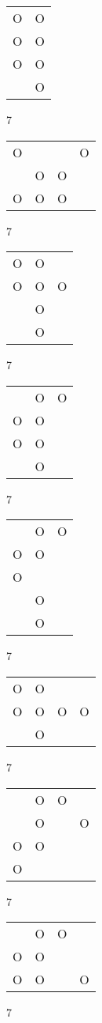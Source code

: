 \begin{tabular}{|m{0.2cm}m{0.2cm}|}\hline
O&O\\
O&O\\
O&O\\
 &O\\
\hline\end{tabular}7
\begin{tabular}{|m{0.2cm}m{0.2cm}m{0.2cm}m{0.2cm}|}\hline
O& & &O\\
 &O&O& \\
O&O&O& \\
\hline\end{tabular}7
\begin{tabular}{|m{0.2cm}m{0.2cm}m{0.2cm}|}\hline
O&O& \\
O&O&O\\
 &O& \\
 &O& \\
\hline\end{tabular}7
\begin{tabular}{|m{0.2cm}m{0.2cm}m{0.2cm}|}\hline
 &O&O\\
O&O& \\
O&O& \\
 &O& \\
\hline\end{tabular}7
\begin{tabular}{|m{0.2cm}m{0.2cm}m{0.2cm}|}\hline
 &O&O\\
O&O& \\
O& & \\
 &O& \\
 &O& \\
\hline\end{tabular}7
\begin{tabular}{|m{0.2cm}m{0.2cm}m{0.2cm}m{0.2cm}|}\hline
O&O& & \\
O&O&O&O\\
 &O& & \\
\hline\end{tabular}7
\begin{tabular}{|m{0.2cm}m{0.2cm}m{0.2cm}m{0.2cm}|}\hline
 &O&O& \\
 &O& &O\\
O&O& & \\
O& & & \\
\hline\end{tabular}7
\begin{tabular}{|m{0.2cm}m{0.2cm}m{0.2cm}m{0.2cm}|}\hline
 &O&O& \\
O&O& & \\
O&O& &O\\
\hline\end{tabular}7
